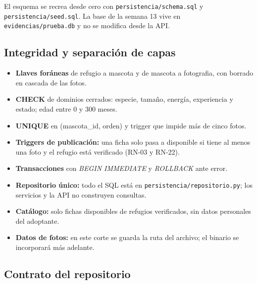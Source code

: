 \documentclass[11pt,a4paper]{article}
\newcommand{\code}[1]{\texttt{#1}}
\begin{document}
El esquema se recrea desde cero con \code{persistencia/schema.sql} y
\code{persistencia/seed.sql}. La base de la semana 13 vive en
\code{evidencias/prueba.db} y no se modifica desde la API.

\subsection{Integridad y separación de capas}

\noindent
\begin{minipage}[t]{0.49\linewidth}
\begin{itemize}
\item \textbf{Llaves foráneas} de refugio a mascota y de mascota a fotografia,
  con borrado en cascada de las fotos.
\item \textbf{CHECK} de dominios cerrados: especie, tamaño, energía,
  experiencia y estado; edad entre 0 y 300 meses.
\item \textbf{UNIQUE} en (mascota\_id, orden) y trigger que impide más de cinco
  fotos.
\item \textbf{Triggers de publicación:} una ficha solo pasa a disponible si
  tiene al menos una foto y el refugio está verificado (RN-03 y RN-22).
\end{itemize}
\end{minipage}\hfill
\begin{minipage}[t]{0.49\linewidth}
\begin{itemize}
\item \textbf{Transacciones} con \emph{BEGIN IMMEDIATE} y \emph{ROLLBACK} ante
  error.
\item \textbf{Repositorio único:} todo el SQL está en
  \code{persistencia/repositorio.py}; los servicios y la API no construyen
  consultas.
\item \textbf{Catálogo:} solo fichas disponibles de refugios verificados, sin
  datos personales del adoptante.
\item \textbf{Datos de fotos:} en este corte se guarda la ruta del archivo; el
  binario se incorporará más adelante.
\end{itemize}
\end{minipage}

\subsection{Contrato del repositorio}
\end{document}
